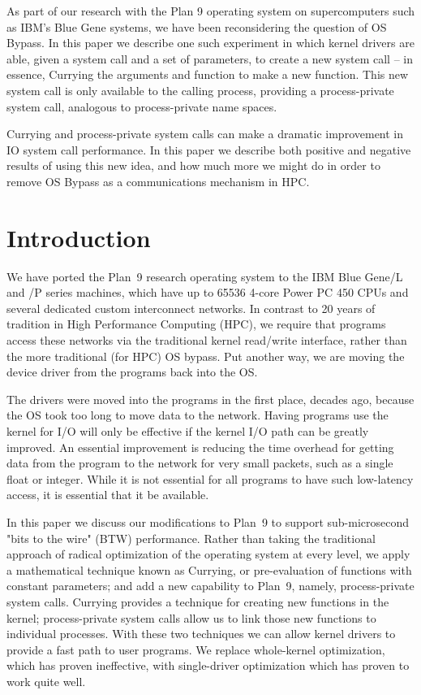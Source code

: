 \documentclass[a4,10pt,preprint]{sigplanconf}
\begin{document}
As part of our research with the Plan 9 operating system on
supercomputers such as IBM's Blue Gene systems, we have been
reconsidering the question of OS Bypass. In this paper we describe one
such experiment in which kernel drivers are able, given a system call
and a set of parameters, to create a new system call -- in essence,
Currying the arguments and function to make a new function. This new
system call is only available to the calling process, providing a
process-private system call, analogous to process-private name spaces.

Currying and process-private system calls can make a dramatic improvement in IO system call performance. In this paper we describe both positive and negative results of using this new idea, and how much more we might do in order to remove OS Bypass as a communications mechanism in HPC. 

\section{Introduction}
We have ported the Plan~9 research operating system to the IBM Blue Gene/L and /P series machines\cite{plan9bgp}, which have up to 65536 4-core Power PC 450 CPUs and several dedicated custom interconnect networks. In contrast 
to 20 years of tradition in High Performance Computing (HPC), we require that programs access these networks via
the traditional kernel read/write interface, rather than the more traditional (for HPC) OS bypass. Put another way, we are moving the device driver from the 
programs back into the OS. 

The drivers were moved into the programs in the first place, decades
ago, because the OS took too long to move data to the network. Having
programs use the kernel for I/O will only be effective if the kernel
I/O path can be greatly improved. An essential improvement is reducing
the time overhead for getting data from the program to the network for
very small packets, such as a single float or integer. While it is
not essential for all programs to have such low-latency access, it is
essential that it be available.

In this paper we discuss our modifications to  Plan~9 to support sub-microsecond "bits to the wire" (BTW) 
performance. Rather than taking the traditional approach of radical optimization of the operating system at 
every level, we apply a mathematical technique known as Currying, or pre-evaluation of functions with constant 
parameters; and add a new capability to Plan~9, namely, process-private system calls. Currying provides 
a technique for creating new functions in the kernel; process-private system calls allow us to link 
those new functions to individual processes. With these two techniques we can allow kernel drivers to provide a fast path to user programs. We replace whole-kernel optimization, which has proven ineffective, with single-driver optimization which has proven to work quite well. 
\end{document}
